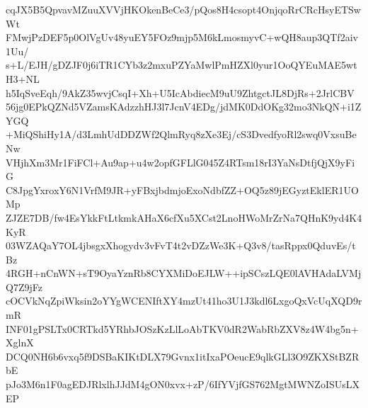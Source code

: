 cqJX5B5QpvavMZuuXVVjHKOkenBeCe3/pQos8H4csopt4OnjqoRrCRcHsyETSwWt
FMwjPzDEF5p0OlVgUv48yuEY5FOz9mjp5M6kLmosmyvC+wQH8aup3QTf2aiv1Uu/
s+L/EJH/gDZJF0j6iTR1CYb3z2mxuPZYaMwlPmHZXl0yur1OoQYEuMAE5wtH3+NL
h5IqSveEqh/9AkZ35wvjCsqI+Xh+U5IcAbdiecM9uU9ZhtgctJL8DjRs+2JrlCBV
56jg0EPkQZNd5VZamsKAdzzhHJ3l7JcnV4EDg/jdMK0DdOKg32mo3NkQN+i1ZYGQ
+MiQShiHy1A/d3LmhUdDDZWf2QlmRyq8zXe3Ej/cS3DvedfyoRl2swq0VxsuBeNw
VHjhXm3Mr1FiFCl+Au9ap+u4w2opfGFLlG045Z4RTsm18rI3YaNsDtfjQjX9yFiG
C8JpgYxroxY6N1VrfM9JR+yFBxjbdmjoExoNdbfZZ+OQ5z89jEGyztEklER1UOMp
ZJZE7DB/fw4EsYkkFtLtkmkAHaX6cfXu5XCst2LnoHWoMrZrNa7QHnK9yd4K4KyR
03WZAQaY7OL4jbsgxXhogydv3vFvT4t2vDZzWe3K+Q3v8/tasRppx0QduvEs/tBz
4RGH+nCnWN+sT9OyaYznRb8CYXMiDoEJLW++ipSCszLQE0lAVHAdaLVMjQ7Z9jFz
cOCVkNqZpiWksin2oYYgWCENIftXY4mzUt41ho3U1J3kdl6LxgoQxVcUqXQD9rmR
INF01gPSLTx0CRTkd5YRhbJOSzKzLlLoAbTKV0dR2WabRbZXV8z4W4bg5n+XglnX
DCQ0NH6b6vxq5f9DSBaKIKtDLX79Gvnx1itIxaPOeucE9qlkGLl3O9ZKXStBZRbE
pJo3M6n1F0agEDJRlxlhJJdM4gON0xvx+zP/6IfYVjfGS762MgtMWNZoISUsLXEP
